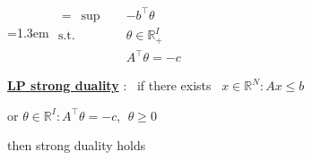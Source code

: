 \documentclass[10pt]{article}
\newenvironment{board}{%
  \par\vspace{4pt}
  \begingroup\leftskip=1.3em\relax\parskip=2pt\relax}{%
  \par\endgroup\vspace{4pt}}
\begin{document}
\begin{board}
$\begin{aligned}
  =\ \sup\quad & -b^{\top}\theta \\
  \text{s.t.}\quad & \theta \in \mathbb{R}^I_+ \\
                   & A^{\top}\theta = -c
\end{aligned}$
\vspace{16pt}

\underline{\textbf{LP strong duality}} : \ if there exists \ $x \in \mathbb{R}^N : Ax \le b$
\vspace{4pt}

\hspace{4.0cm} or \quad $\theta \in \mathbb{R}^I : A^{\top}\theta = -c, \ \ \theta \ge 0$
\vspace{6pt}

\hspace{2.7cm} then strong duality holds
\end{board}
\end{document}
